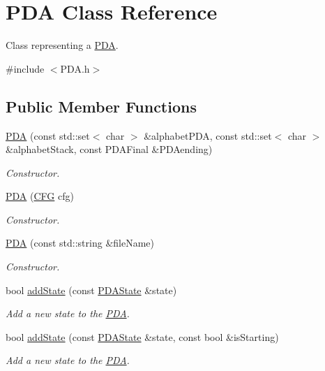 \hypertarget{class_p_d_a}{\section{P\-D\-A Class Reference}
\label{class_p_d_a}
}


Class representing a \hyperlink{class_p_d_a}{P\-D\-A}.  




{\ttfamily \#include $<$P\-D\-A.\-h$>$}

\subsection*{Public Member Functions}
\begin{DoxyCompactItemize}
\item 
\hyperlink{class_p_d_a_ada371103866d34235247f65ddbd5bf8e}{P\-D\-A} (const std\-::set$<$ char $>$ \&alphabet\-P\-D\-A, const std\-::set$<$ char $>$ \&alphabet\-Stack, const P\-D\-A\-Final \&P\-D\-Aending)
\begin{DoxyCompactList}\small\item\em Constructor. \end{DoxyCompactList}\item 
\hyperlink{class_p_d_a_a0bb4ed22f081c4b89510021fdf8aa125}{P\-D\-A} (\hyperlink{class_c_f_g}{C\-F\-G} cfg)
\begin{DoxyCompactList}\small\item\em Constructor. \end{DoxyCompactList}\item 
\hyperlink{class_p_d_a_a5bdc4c651e9b6da0b76cf61504c82034}{P\-D\-A} (const std\-::string \&file\-Name)
\begin{DoxyCompactList}\small\item\em Constructor. \end{DoxyCompactList}\item 
bool \hyperlink{class_p_d_a_a15e2bf53b9d534b9df4753772c480000}{add\-State} (const \hyperlink{class_p_d_a_state}{P\-D\-A\-State} \&state)
\begin{DoxyCompactList}\small\item\em Add a new state to the \hyperlink{class_p_d_a}{P\-D\-A}. \end{DoxyCompactList}\item 
bool \hyperlink{class_p_d_a_aed594ef143a2a18a685c262e99db66d4}{add\-State} (const \hyperlink{class_p_d_a_state}{P\-D\-A\-State} \&state, const bool \&is\-Starting)
\begin{DoxyCompactList}\small\item\em Add a new state to the \hyperlink{class_p_d_a}{P\-D\-A}. \end{DoxyCompactList}\item 

\end{DoxyCompactItemize}
